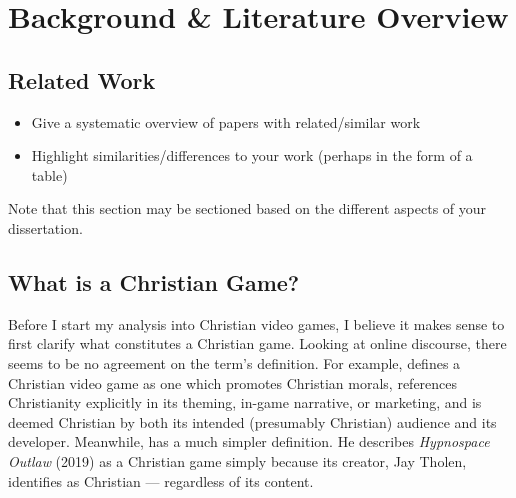 \chapter{Background \& Literature Overview}


\section{Related Work}

  \begin{itemize}
   \item Give a systematic overview of papers with related/similar work
   \item Highlight similarities/differences to your work (perhaps in the form of a table)
  \end{itemize}

  Note that this section may be sectioned based on the different aspects of your dissertation.
\fi

\section{What is a Christian Game?}

Before I start my analysis into Christian video games, I believe it makes sense to first clarify what constitutes a Christian game. Looking at online discourse, there seems to be no agreement on the term's definition. For example, \textcite{moon_channel_why_2023} 
defines a Christian video game as one which promotes Christian morals, references Christianity explicitly in its theming, in-game narrative, or marketing, and is deemed Christian by both its intended (presumably Christian) audience and its developer. Meanwhile, \textcite{hartgrove_why_2022} has a much simpler definition. He describes \textit{Hypnospace Outlaw} (2019) as a Christian game simply because its creator, Jay Tholen, identifies as Christian --- regardless of its content.

